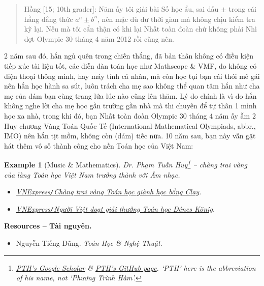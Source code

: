 \documentclass[12pt,twoside]{book}
\newtheorem{example}{Example}
\begin{document}
\begin{quote}
	{\sf Hồng [15; 10th grader]}: Năm ấy tôi giải bài Số học ẩu, sai dấu $\pm$ trong cái hằng đẳng thức $a^n\pm b^n$, nên mặc dù dư thời gian mà không chịu kiểm tra kỹ lại. Nếu mà tôi cẩn thận có khi lại Nhất toàn đoàn chứ không phải Nhì đợt Olympic 30 tháng 4 năm 2012 rồi cũng nên.
\end{quote}
2 năm sau đó, hắn ngủ quên trong chiến thắng, đã bản thân không có điều kiện tiếp xúc tài liệu tốt, các diễn đàn toán học như Mathscope \& VMF, do không có điện thoại thông minh, hay máy tính cá nhân, mà còn học tụi bạn cái thói mê gái nên hắn học hành sa sút, luôn trách cha mẹ sao không thể quan tâm hắn như cha mẹ của đám bạn cùng trang lứa lúc nào cũng lên thăm. Lý do chính là vì do hắn không nghe lời cha mẹ học gần trường gần nhà mà thi chuyên để tự thân 1 mình học xa nhà, trong khi đó, bạn Nhất toàn đoàn Olympic 30 tháng 4 năm ấy ẵm 2 Huy chương Vàng Toán Quốc Tế (International Mathematical Olympiads, abbr., IMO) nên hắn tịt mồm, không còn (dám) tiếc nữa. 10 năm sau, bạn này vẫn gặt hát thêm vô số thành công cho nền Toán học của Việt Nam:

\begin{example}[Music \& Mathematics]
	Dr. {\sc Phạm Tuấn Huy}\footnote{\href{https://scholar.google.com.vn/citations?hl=vi&user=MavyE28AAAAJ}{PTH's Google Scholar} \& \href{https://huytuanpham.github.io/}{PTH's {\sf GitHub} page}. `PTH' here is the abbreviation of his name, not `Phương Trình Hàm'.} -- chàng trai vàng của làng Toán học Việt Nam trưởng thành với Âm nhạc.	
	\begin{itemize}
		\item \href{https://vnexpress.net/chang-trai-vang-toan-hoc-gianh-hoc-bong-clay-4564121.html}{VNExpress{\tt/}Chàng trai vàng Toán học giành học bổng Clay}.
		\item \href{https://vnexpress.net/nguoi-viet-doat-giai-thuong-toan-hoc-denes-k-nig-4742548.html}{VNExpress{\tt/}Người Việt đoạt giải thưởng Toán học Dénes König}.
	\end{itemize}
\end{example}
\noindent\textbf{\textsf{Resources -- Tài nguyên.}}
\begin{itemize}
	\item {\sc Nguyễn Tiếng Dũng}. {\it Toán Học \& Nghệ Thuật}.
\end{itemize}

\end{document}

